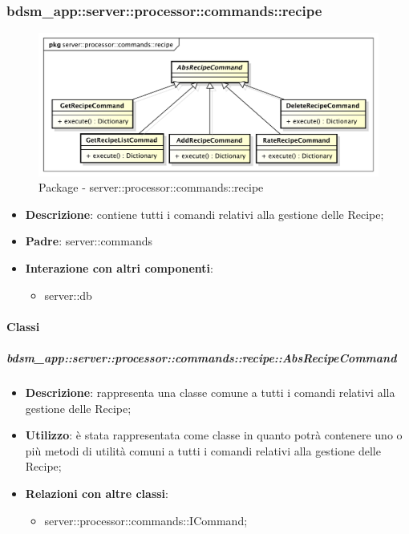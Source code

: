       \subsubsection{bdsm\_app::server::processor::commands::recipe} %
      \label{ssub:bdsm_app_server_processor_commands_recipe}
      \begin{figure}[!htbp]
      	\centering
      	\centerline{\includegraphics[scale=0.5]{./images/server/recipe.pdf}}
      	\caption{Package - server::processor::commands::recipe}
      \end{figure}

      \begin{itemize}
        \item \textbf{Descrizione}: contiene tutti i comandi relativi alla gestione delle Recipe;
        \item \textbf{Padre}: server::commands
        \item \textbf{Interazione con altri componenti}:
          \begin{itemize}
            \item server::db
          \end{itemize}
      \end{itemize}

        \paragraph{Classi} %

        \subparagraph{bdsm\_app::server::processor::commands::recipe::AbsRecipeCommand} %
        \label{subp:bdsm_app_server_processor_commands_recipe_absrecipecommand}
        \begin{itemize}
          \item \textbf{Descrizione}: rappresenta una classe comune a tutti i comandi relativi alla gestione delle Recipe;
          \item \textbf{Utilizzo}: è stata rappresentata come classe in quanto potrà contenere uno o più metodi di utilità comuni a tutti i comandi relativi alla gestione delle Recipe;
          \item \textbf{Relazioni con altre classi}:
            \begin{itemize}
              \item server::processor::commands::ICommand;
            \end{itemize}
        \end{itemize}

